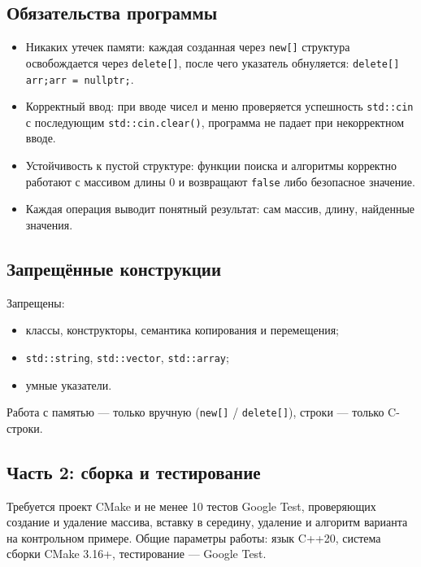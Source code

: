 \subsection{Обязательства программы}

\begin{itemize}
  \item Никаких утечек памяти: каждая созданная через \texttt{new[]} структура
        освобождается через \texttt{delete[]}, после чего указатель
        обнуляется: \texttt{delete[] arr;\allowbreak arr = nullptr;}.
  \item Корректный ввод: при вводе чисел и меню проверяется успешность
        \texttt{std::cin} с последующим \texttt{std::cin.clear()}, программа не
        падает при некорректном вводе.
  \item Устойчивость к пустой структуре: функции поиска и алгоритмы корректно
        работают с массивом длины 0 и возвращают \texttt{false} либо безопасное
        значение.
  \item Каждая операция выводит понятный результат: сам массив, длину,
        найденные значения.
\end{itemize}

\subsection{Запрещённые конструкции}

Запрещены:

\begin{itemize}
  \item классы, конструкторы, семантика копирования и перемещения;
  \item \texttt{std::string}, \texttt{std::vector}, \texttt{std::array};
  \item умные указатели.
\end{itemize}

\noindent Работа с памятью --- только вручную (\texttt{new[]} /
\texttt{delete[]}), строки --- только C-строки.

\subsection{Часть 2: сборка и тестирование}

Требуется проект CMake и не менее 10 тестов Google Test, проверяющих создание
и удаление массива, вставку в середину, удаление и алгоритм варианта на
контрольном примере. Общие параметры работы: язык C++20, система сборки
CMake 3.16+, тестирование --- Google Test.
